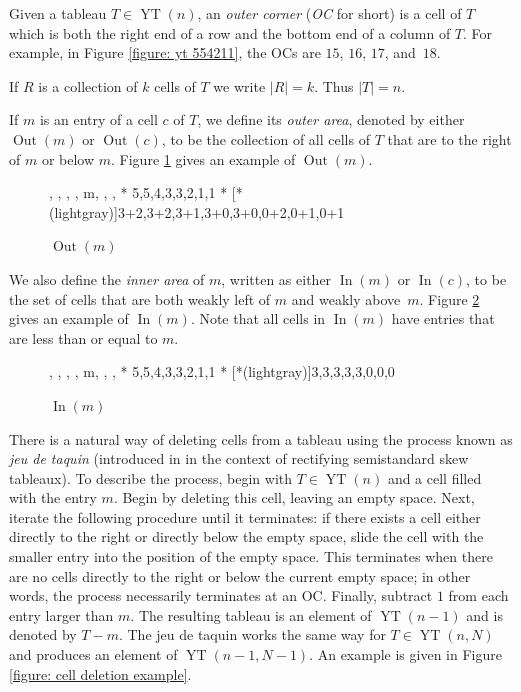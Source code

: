 \documentclass[12pt]{amsart}
\theoremstyle{definition}
\theoremstyle{remark}
\numberwithin{equation}{section}
\numberwithin{figure}{section}
\newcommand{\YT}{\operatorname{YT}}
\newcommand{\Out}{\operatorname{Out}}
\newcommand{\In}{\operatorname{In}}
\begin{document}
Given a tableau $T\in\YT(n)$, an \emph{outer corner} (\emph{OC} for short) is a cell of $T$ which is both the right end of a row and the bottom end of a column of $T$. For example, in Figure \ref{figure: yt 554211}, the OCs are $15$, $16$, $17$, and~$18$.

If $R$ is a collection of $k$ cells of $T$ we write $|R| = k$. Thus $|T| = n$.

If $m$ is an entry of a cell $c$ of $T$, we define its
\emph{outer area}, denoted by either $\Out(m)$ or $\Out(c)$, to be the collection of all cells of $T$ that are to the right of $m$ or below $m$. Figure \ref{figure: out example} gives an example of $\Out(m)$.

\begin{figure}[H]
    \centering
    \ytableaushort
        {\none, \none, \none, \none, \none \none m, \none, \none, \none}
        * {5,5,4,3,3,2,1,1}
        * [*(lightgray)]{3+2,3+2,3+1,3+0,3+0,0+2,0+1,0+1}
    \caption{$\Out(m)$}
    \label{figure: out example}
\end{figure}

We also define the \emph{inner area} of $m$, written as either $\In(m)$ or $\In(c)$, to be the set of cells that are both weakly left of $m$ and weakly above~$m$.
 Figure \ref{figure: in example} gives an example of $\In(m)$.  Note that all cells in $\In(m)$ have entries that are less than or equal to $m$.

\begin{figure}[H]
    \centering
    \ytableaushort
        {\none, \none, \none, \none, \none \none m, \none, \none, \none}
        * {5,5,4,3,3,2,1,1}
        * [*(lightgray)]{3,3,3,3,3,0,0,0}
    \caption{$\In(m)$}
    \label{figure: in example}
\end{figure}


There is a natural way of deleting cells from a tableau using the process known as \emph{jeu de taquin} (introduced in  \cite{Schützenberger1977} in the context of rectifying semistandard skew tableaux). To describe the process, begin with $T \in \YT(n)$ and a cell filled with the entry $m$. Begin by deleting this cell, leaving an empty space. Next, iterate the following procedure until it terminates: if there exists a cell either directly to the right or directly below the empty space, slide the cell with the smaller entry into the position of the empty space. This terminates when there are no cells directly to the right or below the current empty space; in other words, the process necessarily terminates at an OC. Finally, subtract $1$ from each entry larger than $m$. The resulting tableau is an element of $\YT(n-1)$ and is denoted by $T - m$. The jeu de taquin works the same way for $T \in \YT(n,N)$ and produces an element of $\YT(n-1,N-1)$.
An example is given in Figure \ref{figure: cell deletion example}.
\end{document}
